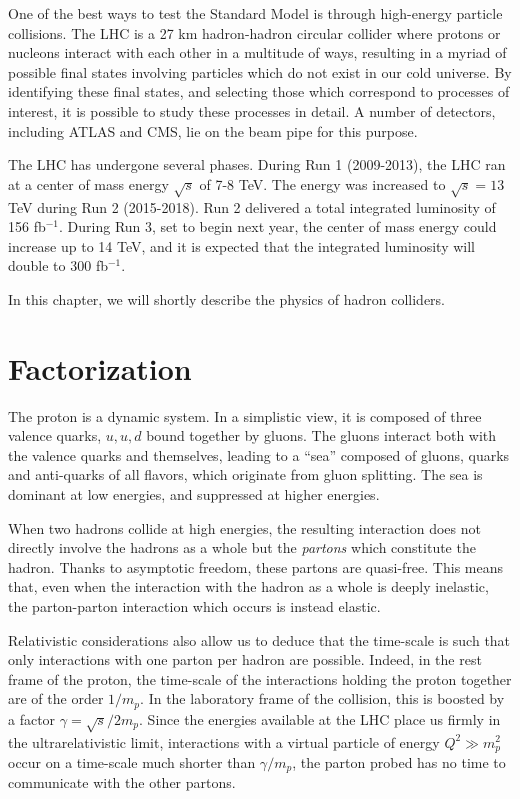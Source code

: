 \documentclass[10pt,a4paper]{book}
\begin{document}
One of the best ways to test the Standard Model is through high-energy particle collisions. The LHC is a 27 km hadron-hadron circular collider where protons or nucleons interact with each other in a multitude of ways, resulting in a myriad of possible final states involving particles which do not exist in our cold universe. By identifying these final states, and selecting those which correspond to processes of interest, it is possible to study these processes in detail. A number of detectors, including ATLAS and CMS, lie on the beam pipe for this purpose.

The LHC has undergone several phases. During Run 1 (2009-2013), the LHC ran at a center of mass energy $\sqrt{s}$ of 7-8 TeV. The energy was increased to $\sqrt{s} = 13$ TeV during Run 2 (2015-2018). 
Run 2 delivered a total integrated luminosity of 156 fb$^{-1}$. During Run 3, set to begin next year, the center of mass energy could increase up to 14 TeV, and it is expected that the integrated luminosity will double to 300 fb$^{-1}$. 

In this chapter, we will shortly describe the physics of hadron colliders.

\section{Factorization}

  
The proton is a dynamic system. In a simplistic view, it is composed of three valence quarks, $u, u, d$ bound together by gluons. The gluons interact both with the valence quarks and themselves, leading to a ``sea'' composed of gluons, quarks and anti-quarks of all flavors, which originate from gluon splitting. The sea is dominant at low energies, and suppressed at higher energies. 

When two hadrons collide at high energies, the resulting interaction does not directly involve the hadrons as a whole but the \emph{partons} which constitute the hadron. Thanks to asymptotic freedom, these partons are quasi-free. This means that, even when the interaction with the hadron as a whole is deeply inelastic, the parton-parton interaction which occurs is instead elastic. 

Relativistic considerations also allow us to deduce that the time-scale is such that only interactions with one parton per hadron are possible. Indeed, in the rest frame of the proton, the time-scale of the interactions holding the proton together are of the order $1/m_p$. In the laboratory frame of the collision, this is boosted by a factor $\gamma = \sqrt{s}/2m_p$. Since the energies available at the LHC place us firmly in the ultrarelativistic limit, interactions with a virtual particle of energy $Q^2 \gg m_p^2$ occur on a time-scale much shorter than $\gamma/m_p$, the parton probed has no time to communicate with the other partons.
\end{document}
